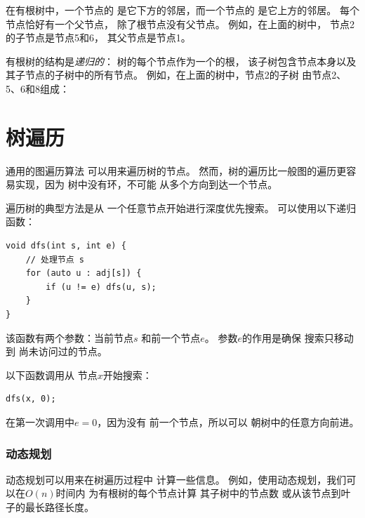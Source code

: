 在有根树中，一个节点的
是它下方的邻居，而一个节点的
是它上方的邻居。
每个节点恰好有一个父节点，
除了根节点没有父节点。
例如，在上面的树中，
节点2的子节点是节点5和6，
其父节点是节点1。


有根树的结构是\emph{递归的}：
树的每个节点作为一个的根，
该子树包含节点本身以及
其子节点的子树中的所有节点。
例如，在上面的树中，节点2的子树
由节点2、5、6和8组成：
\begin{center}
\end{center}

\section{树遍历}

通用的图遍历算法
可以用来遍历树的节点。
然而，树的遍历比一般图的遍历更容易实现，因为
树中没有环，不可能
从多个方向到达一个节点。

遍历树的典型方法是从
一个任意节点开始进行深度优先搜索。
可以使用以下递归函数：

\begin{lstlisting}
void dfs(int s, int e) {
    // 处理节点 s
    for (auto u : adj[s]) {
        if (u != e) dfs(u, s);
    }
}
\end{lstlisting}

该函数有两个参数：当前节点$s$
和前一个节点$e$。
参数$e$的作用是确保
搜索只移动到
尚未访问过的节点。

以下函数调用从
节点$x$开始搜索：

\begin{lstlisting}
dfs(x, 0);
\end{lstlisting}

在第一次调用中$e=0$，因为没有
前一个节点，所以可以
朝树中的任意方向前进。

\subsubsection{动态规划}

动态规划可以用来在树遍历过程中
计算一些信息。
例如，使用动态规划，我们可以在$O(n)$时间内
为有根树的每个节点计算
其子树中的节点数
或从该节点到叶子的最长路径长度。

